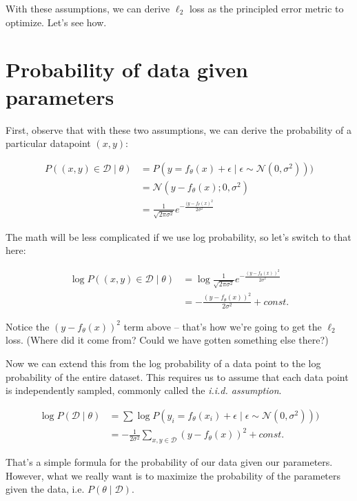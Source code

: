 \documentclass{article}
\begin{document}
With these assumptions, we can derive $\ell_2$ loss as the principled error metric to optimize. Let's see how.

\section{Probability of data given parameters}
First, observe that with these two assumptions, we can derive the probability of a particular datapoint $(x, y)$:

\begin{align}
P((x, y) \in \mathcal{D} \mid \theta) & = 
P(y=f_\theta(x) + \epsilon \mid \epsilon \sim \mathcal{N}(0, \sigma^2)))   \\
& = \mathcal{N}(y - f_\theta(x); 0, \sigma^2) \\
& = \frac{1}{\sqrt{2\pi\sigma^2}} e^{-\frac{(y-f_\theta(x)^2}{2\sigma^2}}
\end{align}

The math will be less complicated if we use log probability, so let's switch to that here:

\begin{align}
\log P((x, y) \in \mathcal{D} \mid \theta) & = 
\log \frac{1}{\sqrt{2\pi\sigma^2}} e^{-\frac{(y-f_\theta(x)) ^2}{2\sigma^2}} \\
& = -\frac{(y-f_\theta(x)) ^2}{2\sigma^2} + const.
\end{align}

Notice the $(y-f_\theta(x))^2$ term above -- that's how we're going to get the $\ell_2$ loss. (Where did it come from? Could we have gotten something else there?)


Now we can extend this from the log probability of a data point to the log probability of the entire dataset. This requires us to assume that each data point is independently sampled, commonly called the \emph{i.i.d. assumption}.

\begin{align}
\log P(\mathcal{D} \mid \theta) & = 
\sum \log P(y_i=f_\theta(x_i) + \epsilon \mid \epsilon \sim \mathcal{N}(0, \sigma^2))) \\
& = -\frac{1}{2\sigma^2} \sum_{x, y \in \mathcal{D}} (y - f_\theta(x))^2 + const.
\end{align}

That's a simple formula for the probability of our data given our parameters. However, what we really want is to maximize the probability of the parameters given the data, i.e. $P(\theta \mid \mathcal{D})$.
\end{document}

